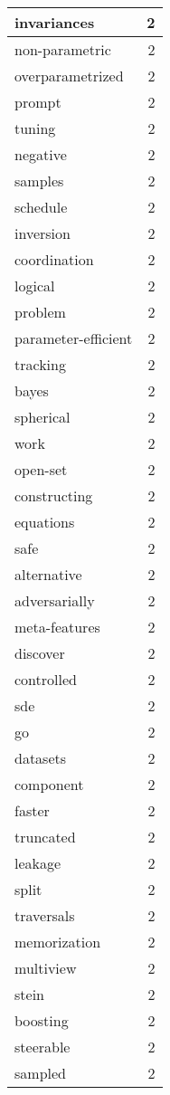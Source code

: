 \begin{table}[h]
\begin{tabular}{|l|r|}
\hline
invariances & 2 \\
\hline
non-parametric & 2 \\
\hline
overparametrized & 2 \\
\hline
prompt & 2 \\
\hline
tuning & 2 \\
\hline
negative & 2 \\
\hline
samples & 2 \\
\hline
schedule & 2 \\
\hline
inversion & 2 \\
\hline
coordination & 2 \\
\hline
logical & 2 \\
\hline
problem & 2 \\
\hline
parameter-efficient & 2 \\
\hline
tracking & 2 \\
\hline
bayes & 2 \\
\hline
spherical & 2 \\
\hline
work & 2 \\
\hline
open-set & 2 \\
\hline
constructing & 2 \\
\hline
equations & 2 \\
\hline
safe & 2 \\
\hline
alternative & 2 \\
\hline
adversarially & 2 \\
\hline
meta-features & 2 \\
\hline
discover & 2 \\
\hline
controlled & 2 \\
\hline
sde & 2 \\
\hline
go & 2 \\
\hline
datasets & 2 \\
\hline
component & 2 \\
\hline
faster & 2 \\
\hline
truncated & 2 \\
\hline
leakage & 2 \\
\hline
split & 2 \\
\hline
traversals & 2 \\
\hline
memorization & 2 \\
\hline
multiview & 2 \\
\hline
stein & 2 \\
\hline
boosting & 2 \\
\hline
steerable & 2 \\
\hline
sampled & 2 \\

\end{tabular}
\end{table}
